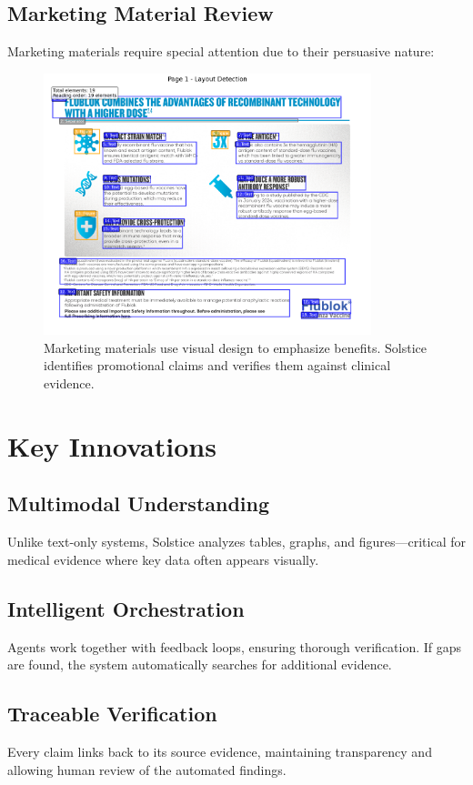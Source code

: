 \documentclass[11pt]{article}
\begin{document}
\subsection{Marketing Material Review}

Marketing materials require special attention due to their persuasive nature:

\begin{figure}[htbp]
\centering
\includegraphics[width=0.85\textwidth]{marketing_layout_example.png}
\caption{Marketing materials use visual design to emphasize benefits. Solstice identifies promotional claims and verifies them against clinical evidence.}
\end{figure}

\section{Key Innovations}

\subsection{Multimodal Understanding}
Unlike text-only systems, Solstice analyzes tables, graphs, and figures—critical for medical evidence where key data often appears visually.

\subsection{Intelligent Orchestration}
Agents work together with feedback loops, ensuring thorough verification. If gaps are found, the system automatically searches for additional evidence.

\subsection{Traceable Verification}
Every claim links back to its source evidence, maintaining transparency and allowing human review of the automated findings.
\end{document}
